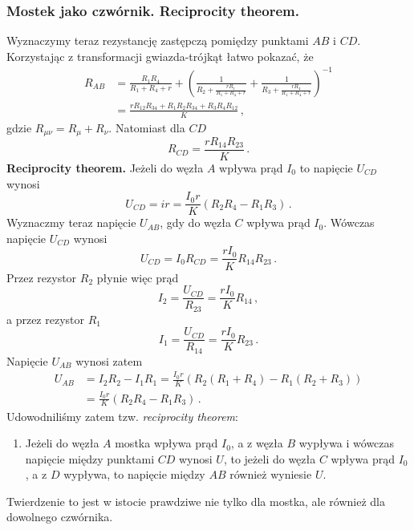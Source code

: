 \documentclass[../main.tex]{subfiles}
\begin{document}
\subsubsection{Mostek jako czwórnik. Reciprocity theorem.}
Wyznaczymy teraz rezystancję zastępczą pomiędzy punktami \(AB\) i \(CD\). Korzystając z transformacji gwiazda-trójkąt łatwo pokazać, że
\begin{equation*}
\begin{split}
    R_{AB}&=\frac{R_1R_4}{R_1+R_4+r}+\left(\frac{1}{R_2+\frac{rR_1}{R_1+R_4+r}}+\frac{1}{R_3+\frac{rR_4}{R_1+R_4+r}}\right)^{-1}\\
    &=\frac{rR_{12}R_{34}+R_1R_2R_{34}+R_3R_4R_{12}}{K}\,,
\end{split}
\end{equation*}
gdzie \(R_{\mu\nu}=R_\mu+R_\nu\). Natomiast dla \(CD\)
\begin{equation*}
    R_{CD}=\frac{rR_{14}R_{23}}{K}\,.
\end{equation*}
\textbf{Reciprocity theorem.} 
Jeżeli do węzła \(A\) wpływa prąd \(I_0\) to napięcie \(U_{CD}\) wynosi
\begin{equation*}
    U_{CD}=ir=\frac{I_0r}{K}(R_2R_4-R_1R_3)\,.
\end{equation*}
Wyznaczmy teraz napięcie \(U_{AB}\), gdy do węzła \(C\) wpływa prąd \(I_0\). Wówczas napięcie \(U_{CD}\) wynosi
\begin{equation*}
    U_{CD}=I_0R_{CD}=\frac{rI_0}{K}R_{14}R_{23}\,.
\end{equation*}
Przez rezystor \(R_2\) płynie więc prąd
\begin{equation*}
    I_2=\frac{U_{CD}}{R_{23}}=\frac{rI_0}{K}R_{14}\,,
\end{equation*}
a przez rezystor \(R_1\)
\begin{equation*}
    I_1=\frac{U_{CD}}{R_{14}}=\frac{rI_0}{K}R_{23}\,.
\end{equation*}
Napięcie \(U_{AB}\) wynosi zatem
\begin{equation*}
\begin{split}
    U_{AB}&=I_2R_2-I_1R_1=\frac{I_0r}{K}\left(R_2(R_1+R_4)-R_1(R_2+R_3)\right)\\
    &=\frac{I_0r}{K}(R_2R_4-R_1R_3)\,.
\end{split}
\end{equation*}
Udowodniliśmy zatem tzw. \textit{reciprocity theorem}:
\begin{enumerate}[]
    \item{Jeżeli do węzła \(A\) mostka wpływa prąd \(I_0\), a z węzła \(B\) wypływa i wówczas napięcie między punktami \(CD\) wynosi \(U\), to jeżeli do węzła \(C\) wpływa prąd \(I_0\), a z \(D\) wypływa, to napięcie między \(AB\) również wyniesie \(U\).}
\end{enumerate}
Twierdzenie to jest w istocie prawdziwe nie tylko dla mostka, ale również dla dowolnego czwórnika.
\end{document}
